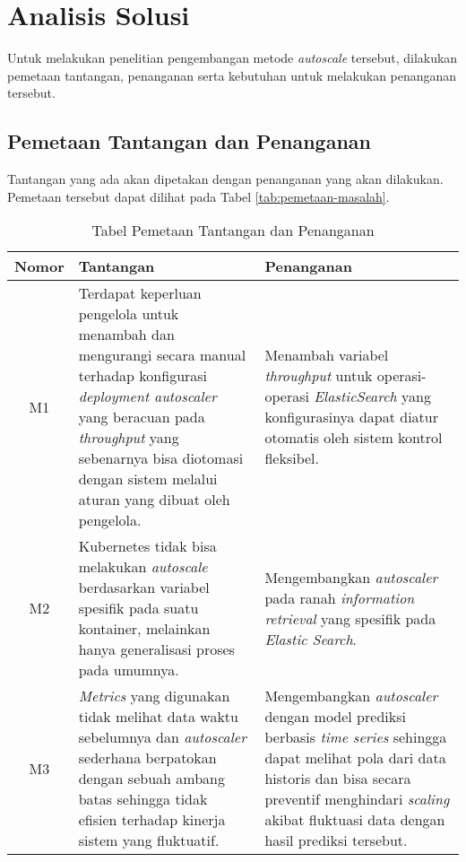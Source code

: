 \section{Analisis Solusi}

Untuk melakukan penelitian pengembangan metode \textit{autoscale} tersebut, dilakukan pemetaan tantangan, penanganan serta kebutuhan untuk melakukan penanganan tersebut.

\subsection{Pemetaan Tantangan dan Penanganan}
\label{sec:pemetaan-masalah}
Tantangan yang ada akan dipetakan dengan penanganan yang akan dilakukan. Pemetaan tersebut dapat dilihat pada Tabel \ref{tab:pemetaan-masalah}.

\begin{table}[h]
    \caption{Tabel Pemetaan Tantangan dan Penanganan}
    \vspace{0.25cm}
    \begin{center}
        \begin{tabular}{|c|p{2.5in}|p{2.5in}|}
            \rowcolor{gray!30}
            \hline
            \textbf{Nomor} & \textbf{Tantangan} & \textbf{Penanganan} \tabularnewline
            \hline
            M1 & Terdapat keperluan pengelola untuk menambah dan mengurangi secara manual terhadap konfigurasi \textit{deployment autoscaler} yang beracuan pada \textit{throughput} yang sebenarnya bisa diotomasi dengan sistem melalui aturan yang dibuat oleh pengelola. &
            Menambah variabel \textit{throughput} untuk operasi-operasi \textit{ElasticSearch} yang konfigurasinya dapat diatur otomatis oleh sistem kontrol fleksibel.
            \tabularnewline

            M2 &
            Kubernetes tidak bisa melakukan \textit{autoscale} berdasarkan variabel spesifik pada suatu kontainer, melainkan hanya generalisasi proses pada umumnya. &
            Mengembangkan \textit{autoscaler} pada ranah \textit{information retrieval} yang spesifik pada \textit{Elastic Search}. \tabularnewline

            M3 &
            \textit{Metrics} yang digunakan tidak melihat data waktu sebelumnya dan \textit{autoscaler} sederhana berpatokan dengan sebuah ambang batas sehingga tidak efisien terhadap kinerja sistem yang fluktuatif. &
            Mengembangkan \textit{autoscaler} dengan model prediksi berbasis \textit{time series} sehingga dapat melihat pola dari data historis dan bisa secara preventif menghindari \textit{scaling} akibat fluktuasi data dengan hasil prediksi tersebut.\tabularnewline


\end{tabular}
\end{center}
\end{table}
